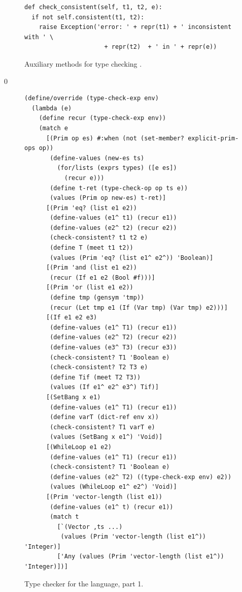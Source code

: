 \documentclass[7x10]{TimesAPriori_MIT}%
\def\racketEd{0}
\providecommand{\BookEdition}{1}
\let\edition\BookEdition
\numberwithin{theorem}{chapter}
\numberwithin{definition}{chapter}
\numberwithin{equation}{chapter}
\begin{document}
{\begin{figure}[tbp]
\begin{tcolorbox}[colback=white]
\begin{lstlisting}
def check_consistent(self, t1, t2, e):
  if not self.consistent(t1, t2):
    raise Exception('error: ' + repr(t1) + ' inconsistent with ' \
                      + repr(t2)  + ' in ' + repr(e))
\end{lstlisting}
\end{tcolorbox}

\caption{Auxiliary methods for type checking \LangGrad{}.}
\label{fig:type-check-Lgradual-aux}
\end{figure}

\fi}


{\if\edition\racketEd        
\begin{figure}[tbp]
\begin{tcolorbox}[colback=white]  
\begin{lstlisting}[basicstyle=\ttfamily\footnotesize]
(define/override (type-check-exp env)
  (lambda (e)
    (define recur (type-check-exp env))
    (match e
      [(Prim op es) #:when (not (set-member? explicit-prim-ops op))
       (define-values (new-es ts)
         (for/lists (exprs types) ([e es])
           (recur e)))
       (define t-ret (type-check-op op ts e))
       (values (Prim op new-es) t-ret)]
      [(Prim 'eq? (list e1 e2))
       (define-values (e1^ t1) (recur e1))
       (define-values (e2^ t2) (recur e2))
       (check-consistent? t1 t2 e)
       (define T (meet t1 t2))
       (values (Prim 'eq? (list e1^ e2^)) 'Boolean)]
      [(Prim 'and (list e1 e2))
       (recur (If e1 e2 (Bool #f)))]
      [(Prim 'or (list e1 e2))
       (define tmp (gensym 'tmp))
       (recur (Let tmp e1 (If (Var tmp) (Var tmp) e2)))]
      [(If e1 e2 e3)
       (define-values (e1^ T1) (recur e1))
       (define-values (e2^ T2) (recur e2))
       (define-values (e3^ T3) (recur e3))
       (check-consistent? T1 'Boolean e)
       (check-consistent? T2 T3 e)
       (define Tif (meet T2 T3))
       (values (If e1^ e2^ e3^) Tif)]
      [(SetBang x e1)
       (define-values (e1^ T1) (recur e1))
       (define varT (dict-ref env x))
       (check-consistent? T1 varT e)
       (values (SetBang x e1^) 'Void)]
      [(WhileLoop e1 e2)
       (define-values (e1^ T1) (recur e1))
       (check-consistent? T1 'Boolean e)
       (define-values (e2^ T2) ((type-check-exp env) e2))
       (values (WhileLoop e1^ e2^) 'Void)]
      [(Prim 'vector-length (list e1))
       (define-values (e1^ t) (recur e1))
       (match t
         [`(Vector ,ts ...)
          (values (Prim 'vector-length (list e1^)) 'Integer)]
         ['Any (values (Prim 'vector-length (list e1^)) 'Integer)])]
\end{lstlisting}
\end{tcolorbox}
\caption{Type checker for the \LangGrad{} language, part 1.}
\label{fig:type-check-Lgradual-1}
\end{figure}

}
\end{document}

